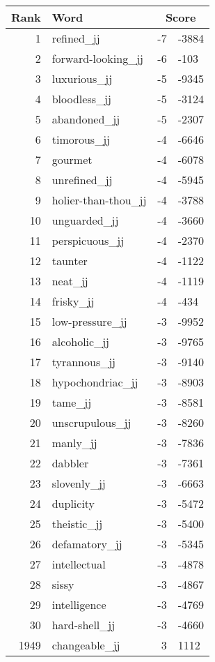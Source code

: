 \begin{longtable}[!htbp]{| rlr@{.}l |}
    \hline
    \textbf{Rank} & \textbf{Word} & \multicolumn{2}{c|}{\textbf{Score}} \\
    \hline
    \endhead
    1 & refined\_jj & -7 & -3884 \\
    2 & forward-looking\_jj & -6 & -103 \\
    3 & luxurious\_jj & -5 & -9345 \\
    4 & bloodless\_jj & -5 & -3124 \\
    5 & abandoned\_jj & -5 & -2307 \\
    6 & timorous\_jj & -4 & -6646 \\
    7 & gourmet & -4 & -6078 \\
    8 & unrefined\_jj & -4 & -5945 \\
    9 & holier-than-thou\_jj & -4 & -3788 \\
    10 & unguarded\_jj & -4 & -3660 \\
    11 & perspicuous\_jj & -4 & -2370 \\
    12 & taunter & -4 & -1122 \\
    13 & neat\_jj & -4 & -1119 \\
    14 & frisky\_jj & -4 & -434 \\
    15 & low-pressure\_jj & -3 & -9952 \\
    16 & alcoholic\_jj & -3 & -9765 \\
    17 & tyrannous\_jj & -3 & -9140 \\
    18 & hypochondriac\_jj & -3 & -8903 \\
    19 & tame\_jj & -3 & -8581 \\
    20 & unscrupulous\_jj & -3 & -8260 \\
    21 & manly\_jj & -3 & -7836 \\
    22 & dabbler & -3 & -7361 \\
    23 & slovenly\_jj & -3 & -6663 \\
    24 & duplicity & -3 & -5472 \\
    25 & theistic\_jj & -3 & -5400 \\
    26 & defamatory\_jj & -3 & -5345 \\
    27 & intellectual & -3 & -4878 \\
    28 & sissy & -3 & -4867 \\
    29 & intelligence & -3 & -4769 \\
    30 & hard-shell\_jj & -3 & -4660 \\
    1949 & changeable\_jj & 3 & 1112 \\

\end{longtable}

